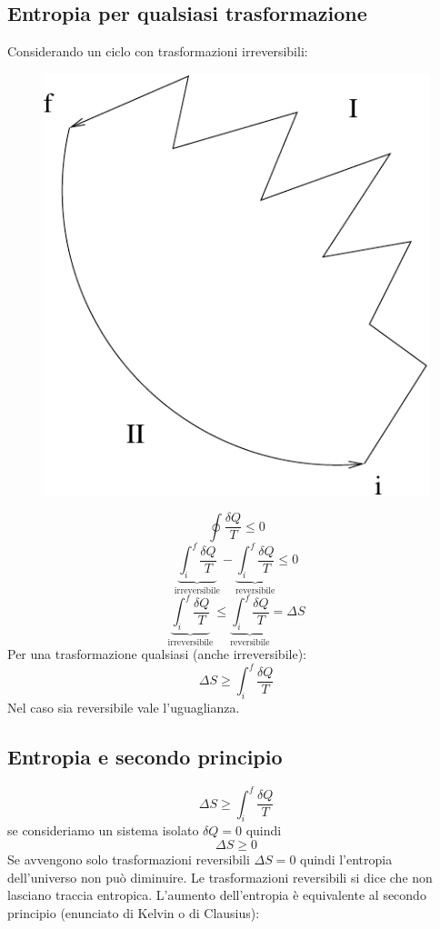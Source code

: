 \subsection{Entropia per qualsiasi trasformazione}
Considerando un ciclo con trasformazioni irreversibili:
\begin{figure}[!htbp]
\centering
\includegraphics[scale=0.5]{immagini/fisica1/ciclo_misto}
\end{figure}

\[\oint\frac{\delta Q}{T}\leq 0\]
\[\underbrace{\int_i^f\frac{\delta Q}{T}}_\text{irreversibile}-\underbrace{\int_i^f\frac{\delta Q}{T}}_\text{reversibile}\leq 0\]
\[\underbrace{\int_i^f\frac{\delta Q}{T}}_\text{irreversibile}\leq\underbrace{\int_i^f\frac{\delta Q}{T}}_\text{reversibile}=\Delta S\]
Per una trasformazione qualsiasi (anche irreversibile):
\[\Delta S\geq\int_i^f\frac{\delta Q}{T}\]
Nel caso sia reversibile vale l'uguaglianza.

\subsection{Entropia e secondo principio}
\[\Delta S\geq\int_i^f\frac{\delta Q}{T}\]
se consideriamo un sistema isolato $\delta Q=0$ quindi
\[\Delta S\geq 0\]
Se avvengono solo trasformazioni reversibili $\Delta S=0$ quindi l'entropia dell'universo non può diminuire. Le trasformazioni reversibili si dice che non lasciano traccia entropica. L'aumento dell'entropia è equivalente al secondo principio (enunciato di Kelvin o di Clausius):
